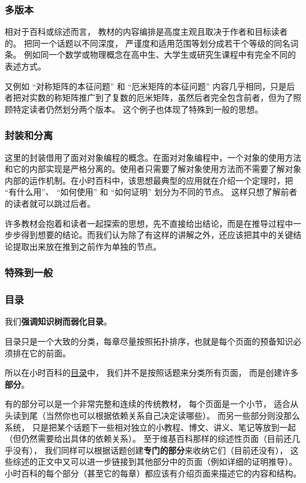 \subsubsection{多版本}
相对于百科或综述而言， 教材的内容编排是高度主观且取决于作者和目标读者的。 把同一个话题以不同深度， 严谨度和适用范围等划分成若干个等级的同名词条。 例如同一个数学或物理概念在高中生、大学生或研究生课程中有完全不同的表述方式。

又例如 “对称矩阵的本征问题” 和 “厄米矩阵的本征问题” 内容几乎相同，只是后者把对实数的称矩阵推广到了复数的厄米矩阵，虽然后者完全包含前者，但为了照顾特定读者仍然划分两个版本。 这个例子也体现了特殊到一般的思想。

\subsubsection{封装和分离}
这里的封装借用了面对对象编程的概念。在面对对象编程中，一个对象的使用方法和它的内部实现是严格分离的。使用者只需要了解对象使用方法而不需要了解对象内部的运作机制。在小时百科中，该思想最典型的应用就在介绍一个定理时，把 “有什么用”、 “如何使用” 和 “如何证明” 划分为不同的节点。 这样只想了解前者的读者就可以跳过后者。

许多教材会抱着和读者一起探索的思想，先不直接给出结论，而是在推导过程中一步步得到想要的结论。而我们认为除了有这样的讲解之外，还应该把其中的关键结论提取出来放在推到之前作为单独的节点。

\subsubsection{特殊到一般}

\subsubsection{目录}
我们\textbf{强调知识树而弱化目录}。 

目录只是一个大致的分类，每章尽量按照拓扑排序，也就是每个页面的预备知识必须排在它的前面。

所以在小时百科的\href{http://wuli.wiki/online}{目录}中， 我们并不是按照话题来分类所有页面， 而是创建许多\textbf{部分}。

有的部分可以是一个非常完整和连续的传统教材， 每个页面是一个小节， 适合从头读到尾（当然你也可以根据依赖关系自己决定读哪些）。 而另一些部分则没那么系统， 只是把某个话题下一些相对独立的小教程、博文、讲义、笔记等放到一起（但仍然需要给出具体的依赖关系）。 至于维基百科那样的综述性页面（目前还几乎没有）， 我们同样可以根据话题创建\textbf{专门的部分}来收纳它们（目前还没有）， 这些综述的正文中又可以进一步链接到其他部分中的页面（例如详细的证明推导）。 小时百科的每个部分（甚至它的每章）都应该有介绍页面来描述它的内容和结构。

